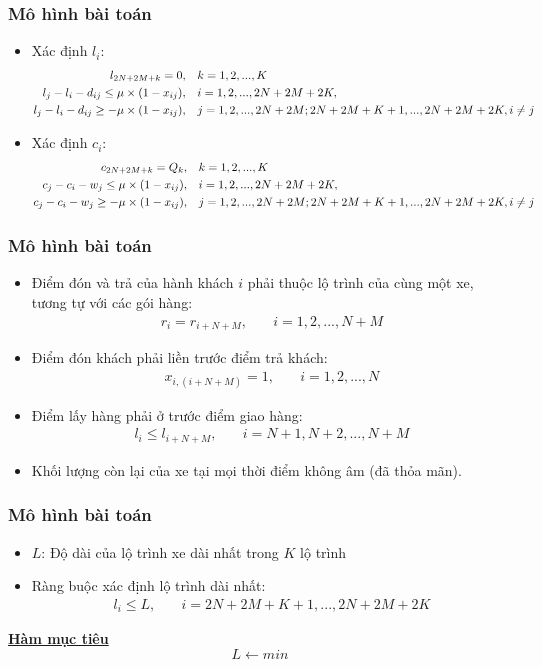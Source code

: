 \documentclass{beamer}
\begin{document}
\begin{frame}
\frametitle{Mô hình bài toán}
\begin{itemize}
\item Xác định $l_i$:
\begin{align}
l_{2N+2M+k} = 0,\quad & k=1,2,...,K \\
l_j - l_i -d_{ij}\leq \mu\times (1 - x_{ij}),\quad & i=1,2,...,2N+2M+2K, \\
l_j - l_i -d_{ij}\geq -\mu\times (1 - x_{ij}),\quad & j=1,2,...,2N+2M;2N+2M+K+1,...,2N+2M+2K, i\ne j \notag
\end{align}
\item Xác định $c_i$:
\begin{align}
c_{2N+2M+k} = Q_k,\quad & k=1,2,...,K \\
c_j - c_i - w_j\leq \mu\times (1 - x_{ij}),\quad & i=1,2,...,2N+2M+2K, \\
c_j - c_i - w_j\geq -\mu\times (1 - x_{ij}),\quad & j=1,2,...,2N+2M;2N+2M+K+1,...,2N+2M+2K, i\ne j \notag \notag
\end{align}
\end{itemize}
\end{frame}
\begin{frame}
\frametitle{Mô hình bài toán}
\begin{itemize}
\item Điểm đón và trả của hành khách $i$ phải thuộc lộ trình của cùng một xe, tương tự với các gói hàng:
\begin{align}
r_i = r_{i+N+M},\quad & i=1,2,...,N+M
\end{align}
\item Điểm đón khách phải liền trước điểm trả khách:
\begin{align}
x_{i,(i+N+M)} = 1,\quad & i=1,2,...,N
\end{align}
\item Điểm lấy hàng phải ở trước điểm giao hàng:
\begin{align}
l_i \leq l_{i+N+M},\quad & i=N+1,N+2,...,N+M
\end{align}
\item Khối lượng còn lại của xe tại mọi thời điểm không âm (đã thỏa mãn).
\end{itemize}
\end{frame}
\begin{frame}
\frametitle{Mô hình bài toán}
\begin{itemize}
\item $L$: Độ dài của lộ trình xe dài nhất trong $K$ lộ trình
\item Ràng buộc xác định lộ trình dài nhất:
\begin{align}
l_i\leq L,\quad & i=2N+2M+K+1,...,2N+2M+2K
\end{align}
\end{itemize}
\textbf{\underline{Hàm mục tiêu}}
\begin{equation}
L \leftarrow min
\end{equation}
\end{frame}
\end{document}
